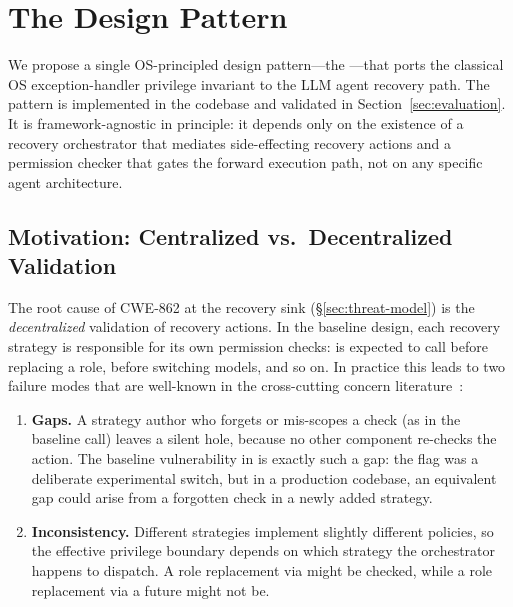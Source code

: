 
\section{The \reauthgate{} Design Pattern}
\label{sec:defense}

We propose a single OS-principled design pattern---the \reauthgate{}---that ports the classical OS exception-handler privilege invariant to the LLM agent recovery path. The pattern is implemented in the \system{} codebase and validated in Section~\ref{sec:evaluation}. It is framework-agnostic in principle: it depends only on the existence of a recovery orchestrator that mediates side-effecting recovery actions and a permission checker that gates the forward execution path, not on any specific agent architecture.

\subsection{Motivation: Centralized vs.\ Decentralized Validation}
\label{sec:centralize-motivation}

The root cause of CWE-862 at the recovery sink (\S\ref{sec:threat-model}) is the \emph{decentralized} validation of recovery actions. In the baseline design, each recovery strategy is responsible for its own permission checks:  is expected to call  before replacing a role,  before switching models, and so on. In practice this leads to two failure modes that are well-known in the cross-cutting concern literature~\cite{aspectj}:

\begin{enumerate}[leftmargin=*]
    \item \textbf{Gaps.} A strategy author who forgets or mis-scopes a check (as in the baseline  call) leaves a silent hole, because no other component re-checks the action. The baseline vulnerability in \system{} is exactly such a gap: the  flag was a deliberate experimental switch, but in a production codebase, an equivalent gap could arise from a forgotten check in a newly added strategy.
    \item \textbf{Inconsistency.} Different strategies implement slightly different policies, so the effective privilege boundary depends on which strategy the orchestrator happens to dispatch. A role replacement via  might be checked, while a role replacement via a future  might not be.
\end{enumerate}

